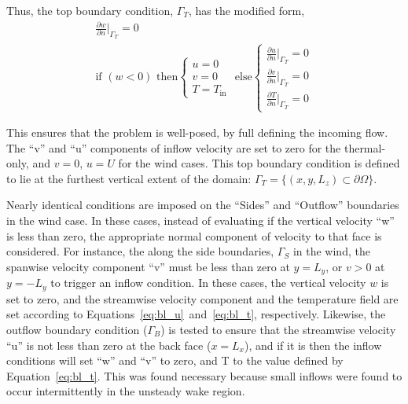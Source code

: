 
Thus, the top boundary condition, $\Gamma_T$, has the modified form, 
\begin{align}
  \frac{\partial w}{\partial n}\bigg|_{\Gamma_T} = 0 \\
  \text{if } (w<0) \text{ then} \begin{cases}
    u = 0\\
    v = 0\\
    T = T_{\text{in}}
  \end{cases}
  \text{ else} \begin{cases}
    \frac{\partial u}{\partial n}\bigg|_{\Gamma_T} = 0 \\  
    \frac{\partial v}{\partial n}\bigg|_{\Gamma_T} = 0 \\  
    \frac{\partial T}{\partial n}\bigg|_{\Gamma_T} = 0
  \end{cases}
\end{align}

This ensures that the problem is well-posed, by full defining the
incoming flow. The ``v'' and ``u'' components of inflow velocity are set
to zero for the thermal-only, and $v=0$, $u=U$ for the wind cases. This
top boundary condition is defined to lie at the furthest vertical extent
of the domain: $\Gamma_T = \{(x,y,L_z) \subset \partial \Omega \} $.  

Nearly identical conditions are imposed on the ``Sides'' and ``Outflow''
boundaries in the wind case. In these cases, instead of evaluating if
the vertical velocity ``w'' is less than zero, the appropriate normal
component of velocity to that face is considered. For instance, the
along the side boundaries, $\Gamma_S$ in the wind, the spanwise velocity
component ``v'' must be less than zero at $y=L_y$, or $v>0$ at $y=-L_y$
to trigger an inflow condition. In these cases, the vertical velocity
$w$ is set to zero, and the streamwise velocity component and the
temperature field are set according to
Equations~\ref{eq:bl_u}~and~\ref{eq:bl_t}, respectively. Likewise, the
outflow boundary condition ($\Gamma_B$) is tested to ensure that the
streamwise  velocity ``u'' is not less than zero at the back face
($x=L_x$), and if it is then the inflow  conditions will set ``w'' and
``v'' to zero, and T to the value defined by
Equation~\ref{eq:bl_t}. This was found necessary because small inflows
were found to occur intermittently in the unsteady wake region. 

